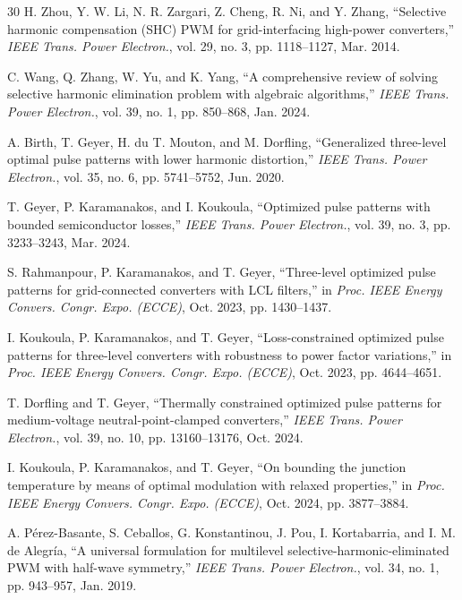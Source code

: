 \documentclass[conference]{IEEEtran}
\begin{document}
\begin{thebibliography}{30}
H. Zhou, Y. W. Li, N. R. Zargari, Z. Cheng, R. Ni, and Y. Zhang, ``Selective
harmonic compensation (SHC) PWM for grid-interfacing high-power converters,''
\emph{IEEE Trans. Power Electron.}, vol. 29, no. 3, pp. 1118--1127, Mar. 2014.

C. Wang, Q. Zhang, W. Yu, and K. Yang, ``A comprehensive review of solving
selective harmonic elimination problem with algebraic algorithms,'' \emph{IEEE
Trans. Power Electron.}, vol. 39, no. 1, pp. 850--868, Jan. 2024.

A. Birth, T. Geyer, H. du T. Mouton, and M. Dorfling, ``Generalized three-level
optimal pulse patterns with lower harmonic distortion,'' \emph{IEEE Trans. Power
Electron.}, vol. 35, no. 6, pp. 5741--5752, Jun. 2020.

T. Geyer, P. Karamanakos, and I. Koukoula, ``Optimized pulse patterns with
bounded semiconductor losses,'' \emph{IEEE Trans. Power Electron.}, vol. 39,
no. 3, pp. 3233--3243, Mar. 2024.

S. Rahmanpour, P. Karamanakos, and T. Geyer, ``Three-level optimized pulse
patterns for grid-connected converters with LCL filters,'' in \emph{Proc. IEEE
Energy Convers. Congr. Expo. (ECCE)}, Oct. 2023, pp. 1430--1437.

I. Koukoula, P. Karamanakos, and T. Geyer, ``Loss-constrained optimized pulse
patterns for three-level converters with robustness to power factor
variations,'' in \emph{Proc. IEEE Energy Convers. Congr. Expo. (ECCE)}, Oct.
2023, pp. 4644--4651.

T. Dorfling and T. Geyer, ``Thermally constrained optimized pulse patterns for
medium-voltage neutral-point-clamped converters,'' \emph{IEEE Trans. Power
Electron.}, vol. 39, no. 10, pp. 13160--13176, Oct. 2024.

I. Koukoula, P. Karamanakos, and T. Geyer, ``On bounding the junction temperature
by means of optimal modulation with relaxed properties,'' in \emph{Proc. IEEE
Energy Convers. Congr. Expo. (ECCE)}, Oct. 2024, pp. 3877--3884.

A. P\'{e}rez-Basante, S. Ceballos, G. Konstantinou, J. Pou, I. Kortabarria,
and I. M. de Alegr\'{i}a, ``A universal formulation for multilevel
selective-harmonic-eliminated PWM with half-wave symmetry,'' \emph{IEEE Trans.
Power Electron.}, vol. 34, no. 1, pp. 943--957, Jan. 2019.


\end{thebibliography}
\end{document}
